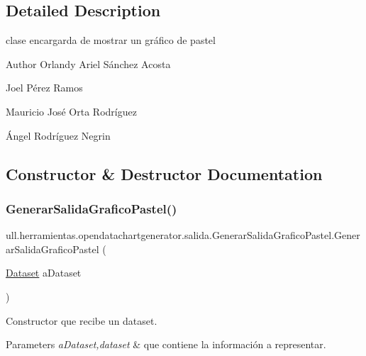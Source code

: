 \subsection{Detailed Description}
clase encargarda de mostrar un gráfico de pastel 

\begin{DoxyAuthor}{Author}
Orlandy Ariel Sánchez Acosta 

Joel Pérez Ramos 

Mauricio José Orta Rodríguez 

Ángel Rodríguez Negrin 
\end{DoxyAuthor}


\subsection{Constructor \& Destructor Documentation}
\mbox{\label{classull_1_1herramientas_1_1opendatachartgenerator_1_1salida_1_1_generar_salida_grafico_pastel_af175e7306ddf43273ecaf53d329d12eb}} 
\subsubsection{\texorpdfstring{Generar\+Salida\+Grafico\+Pastel()}{GenerarSalidaGraficoPastel()}}
{\footnotesize\ttfamily ull.\+herramientas.\+opendatachartgenerator.\+salida.\+Generar\+Salida\+Grafico\+Pastel.\+Generar\+Salida\+Grafico\+Pastel (\begin{DoxyParamCaption}\item[{\mbox{\hyperlink{classull_1_1herramientas_1_1opendatachartgenerator_1_1_dataset}{Dataset}}}]{a\+Dataset }\end{DoxyParamCaption})}



Constructor que recibe un dataset. 


\begin{DoxyParams}{Parameters}
{\em a\+Dataset,dataset} & que contiene la información a representar. \\
\hline
\end{DoxyParams}


